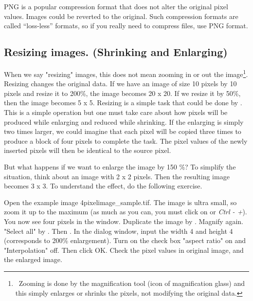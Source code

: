 PNG is a popular compression format that does not alter the original pixel values. Images could be reverted to the original. Such compression formats are called ``loss-less'' formats, so if you really need to compress files, use PNG format.  

\subsection{Resizing images. (Shrinking and Enlarging) }

When we say "resizing" images, this does not mean zooming in or out the
image\footnote{\ Zooming is done by the magnification tool (icon of
magnification glass) and this simply enlarges or shrinks the pixels, not
modifying the original data. \par }. Resizing changes the original data. If we
have an image of size 10 pixels by 10 pixels and resize it to 200\%, the image
becomes 20 x 20.
If we resize it by 50\%, then the image becomes 5 x 5. Resizing is a simple task
that could be done by . This is a simple
operation but one must take care about how pixels will be produced while
enlarging and reduced while shrinking. If the enlarging is simply two times
larger, we could imagine that each pixel will be copied three times to produce a
block of four pixels to complete the task. The pixel values of the newly
inserted pixels will then be identical to the source pixel.

But what happens if we want to enlarge the image by 150 \%? To simplify the
situation, think about an image with 2 x 2 pixels. Then the resulting image
becomes 3 x 3. To understand the effect, do the following exercise.


\begin{indentexercise}{1}
Open the example image
4pixelimage\_sample.tif. The image is ultra small, so zoom it
up to the maximum (as much as you can, you must click on or
\textit{Ctrl - +}). You now see four pixels in the window.
Duplicate the image by .
Magnify again. "Select all" by
.
Then .
In the dialog window, input the width 4 and height 4 (corresponds to
200\% enlargement). Turn on the check box "aspect
ratio" on and
"Interpolation" off. Then click
OK. Check the pixel values in original image, and the enlarged image.
\end{indentexercise}

